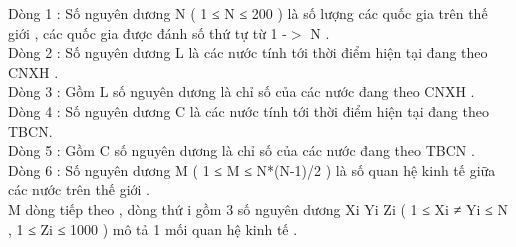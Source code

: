 Dòng 1 : Số nguyên dương N ( 1 ≤ N ≤ 200 ) là số lượng các quốc gia trên thế giới , các quốc gia được đánh số thứ tự từ 1 -$>$ N .   
\\   Dòng 2 : Số nguyên dương L là các nước tính tới thời điểm hiện tại đang theo CNXH .   
\\   Dòng 3 : Gồm L số nguyên dương là chỉ số của các nước đang theo CNXH .   
\\   Dòng 4 : Số nguyên dương C là các nước tính tới thời điểm hiện tại đang theo TBCN.   
\\   Dòng 5 : Gồm C số nguyên dương là chỉ số của các nước đang theo TBCN .   
\\   Dòng 6 : Số nguyên dương M ( 1 ≤ M ≤ N*(N-1)/2 ) là số quan hệ kinh tế giữa các nước trên thế giới .   
\\   M dòng tiếp theo , dòng thứ i gồm 3 số nguyên dương Xi Yi Zi ( 1 ≤ Xi ≠ Yi ≤ N , 1 ≤ Zi ≤ 1000 ) mô tả 1 mối quan hệ kinh tế .  

\